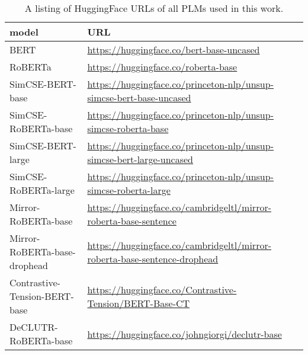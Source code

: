 \documentclass{article} \usepackage{iclr2021_conference,times}
\begin{document}
\begin{table*}[h] \scriptsize
\setlength{\tabcolsep}{1pt}
\centering
\begin{tabular}{ll}
\toprule
model & URL \\
\midrule
BERT & \url{https://huggingface.co/bert-base-uncased} \\
RoBERTa & \url{https://huggingface.co/roberta-base} \\
SimCSE-BERT-base & \url{https://huggingface.co/princeton-nlp/unsup-simcse-bert-base-uncased} \\
SimCSE-RoBERTa-base & \url{https://huggingface.co/princeton-nlp/unsup-simcse-roberta-base} \\
SimCSE-BERT-large & \url{https://huggingface.co/princeton-nlp/unsup-simcse-bert-large-uncased} \\
SimCSE-RoBERTa-large & \url{https://huggingface.co/princeton-nlp/unsup-simcse-roberta-large} \\
Mirror-RoBERTa-base & \url{https://huggingface.co/cambridgeltl/mirror-roberta-base-sentence} \\
Mirror-RoBERTa-base-drophead & \url{https://huggingface.co/cambridgeltl/mirror-roberta-base-sentence-drophead} \\
Contrastive-Tension-BERT-base & \url{https://huggingface.co/Contrastive-Tension/BERT-Base-CT} \\
DeCLUTR-RoBERTa-base & \url{https://huggingface.co/johngiorgi/declutr-base} \\
\bottomrule
\end{tabular}
\caption{A listing of HuggingFace URLs of all PLMs used in this work.}
\label{tab:model_url}
\end{table*}
\end{document}
